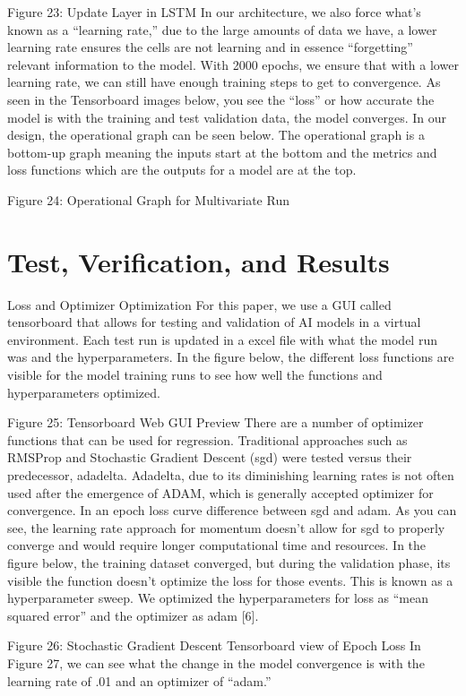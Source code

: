\documentclass{article}
\begin{document}
Figure 23: Update Layer in LSTM
In our architecture, we also force what's known as a ``learning rate,'' due to the large amounts of data we have, a lower learning rate ensures the cells are not learning and in essence ``forgetting'' relevant information to the model. With 2000 epochs, we ensure that with a lower learning rate, we can still have enough training steps to get to convergence. As seen in the Tensorboard images below, you see the ``loss'' or how accurate the model is with the training and test validation data, the model converges. In our design, the operational graph can be seen below. The operational graph is a bottom-up graph meaning the inputs start at the bottom and the metrics and loss functions which are the outputs for a model are at the top.

Figure 24: Operational Graph for Multivariate Run

\section{Test, Verification, and Results}
Loss and Optimizer Optimization
For this paper, we use a GUI called tensorboard that allows for testing and validation of AI models in a virtual environment. Each test run is updated in a excel file with what the model run was and the hyperparameters. In the figure below, the different loss functions are visible for the model training runs to see how well the functions and hyperparameters optimized.

Figure 25: Tensorboard Web GUI Preview
There are a number of optimizer functions that can be used for regression. Traditional approaches such as RMSProp and Stochastic Gradient Descent (sgd) were tested versus their predecessor, adadelta. Adadelta, due to its diminishing learning rates is not often used after the emergence of ADAM, which is generally accepted optimizer for convergence. In an epoch loss curve difference between sgd and adam. As you can see, the learning rate approach for momentum doesn't allow for sgd to properly converge and would require longer computational time and resources. In the figure below, the training dataset converged, but during the validation phase, its visible the function doesn’t optimize the loss for those events. This is known as a hyperparameter sweep. We optimized the hyperparameters for loss as ``mean squared error'' and the optimizer as adam [6].

Figure 26: Stochastic Gradient Descent Tensorboard view of Epoch Loss
In Figure 27, we can see what the change in the model convergence is with the learning rate of .01 and an optimizer of ``adam.''
\end{document}

